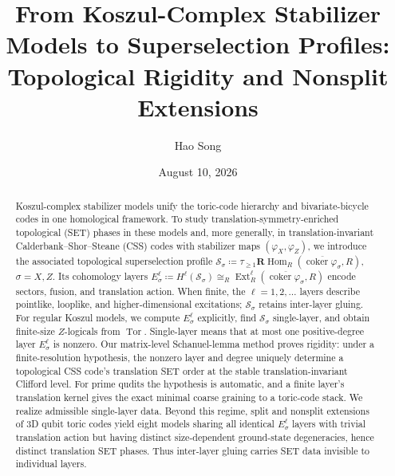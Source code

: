 \documentclass[aps,prx,english,superscriptaddress,twocolumn,tightenlines,showpacs,longbibliography,floatfix,amsfonts]{revtex4-2}
\theoremstyle{remark}
\theoremstyle{definition}
\begin{document}
	\title{From Koszul-Complex Stabilizer Models to Superselection Profiles:\\ Topological Rigidity and Nonsplit Extensions}
	\author{Hao Song}
	\date{August 10, 2026}

	\begin{abstract}
		Koszul-complex stabilizer models unify the toric-code hierarchy and bivariate-bicycle codes in one homological framework. To study translation-symmetry-enriched topological (SET) phases in these models and, more generally, in translation-invariant Calderbank--Shor--Steane (CSS) codes with stabilizer maps $(\varphi_X,\varphi_Z)$, we introduce the associated topological superselection profile $\mathscr S_\sigma\coloneqq\tau_{\geq1}\mathbf R\!\operatorname{Hom}_R(\overline{\operatorname{coker}\varphi_\sigma},R)$, $\sigma=X,Z$. Its cohomology layers $E_\sigma^\ell\coloneqq H^\ell(\mathscr S_\sigma)\cong_R\operatorname{Ext}_R^\ell(\overline{\operatorname{coker}\varphi_\sigma},R)$ encode sectors, fusion, and translation action. When finite, the $\ell=1,2,\ldots$ layers describe pointlike, looplike, and higher-dimensional excitations; $\mathscr S_\sigma$ retains inter-layer gluing. For regular Koszul models, we compute $E_\sigma^\ell$ explicitly, find $\mathscr S_\sigma$ single-layer, and obtain finite-size $Z$-logicals from $\operatorname{Tor}$. Single-layer means that at most one positive-degree layer $E_\sigma^\ell$ is nonzero. Our matrix-level Schanuel-lemma method proves rigidity: under a finite-resolution hypothesis, the nonzero layer and degree uniquely determine a topological CSS code's translation SET order at the stable translation-invariant Clifford level. For prime qudits the hypothesis is automatic, and a finite layer's translation kernel gives the exact minimal coarse graining to a toric-code stack. We realize admissible single-layer data. Beyond this regime, split and nonsplit extensions of 3D qubit toric codes yield eight models sharing all identical $E_\sigma^\ell$ layers with trivial translation action but having distinct size-dependent ground-state degeneracies, hence distinct translation SET phases. Thus inter-layer gluing carries SET data invisible to individual layers.
	\end{abstract}

	\maketitle
\end{document}
